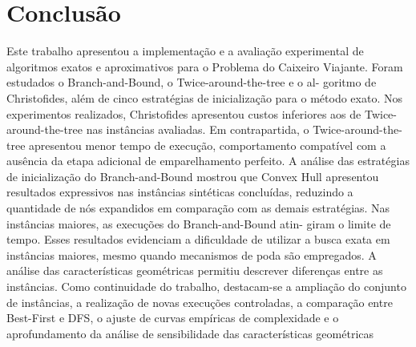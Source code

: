 \documentclass[12pt]{article}
\begin{document}
\begin{table}[htbp]
\centering
\caption{Resumo experimental de custo, tempo, memória e busca no TSP.}
\label{tab:resumo_tsp}
\small
\setlength{\tabcolsep}{3pt}
\end{table}





	\section{Conclusão}
	\label{sec_conclusao}
	
	Este trabalho apresentou a implementação e a avaliação experimental de
algoritmos  exatos e aproximativos para o Problema do Caixeiro Viajante.
Foram estudados o Branch-and-Bound, o Twice-around-the-tree e o al-
goritmo de Christofides, além de cinco estratégias de inicialização para o
método exato.
Nos experimentos realizados, Christofides apresentou custos inferiores aos
de Twice-around-the-tree nas  instâncias avaliadas. Em contrapartida, o
Twice-around-the-tree apresentou menor tempo de execução, comportamento
compatível com a ausência da etapa adicional de emparelhamento perfeito.
A análise das estratégias de inicialização do Branch-and-Bound mostrou
que Convex Hull apresentou resultados expressivos nas instâncias sintéticas
concluídas, reduzindo a quantidade de nós expandidos em comparação com
as demais estratégias.
Nas instâncias maiores, as execuções do Branch-and-Bound atin-
giram o limite de tempo. Esses resultados
evidenciam a dificuldade de utilizar a busca exata em instâncias maiores,
mesmo quando mecanismos de poda são empregados.
A análise das características geométricas permitiu descrever diferenças
entre as instâncias. Como continuidade do trabalho, destacam-se a ampliação do conjunto de
instâncias, a realização de novas execuções controladas, a comparação  entre Best-First e DFS, o ajuste de curvas empíricas de complexidade
e o aprofundamento da análise de sensibilidade das características geométricas

  
	
\end{document}
